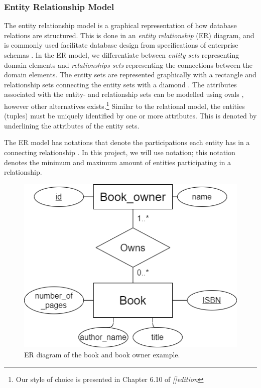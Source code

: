 \subsubsection{Entity Relationship Model}\label{sec:EntityRelationModel}
The entity relationship model is a graphical representation of how database relations are structured.
This is done in an \textit{entity relationship} (ER) diagram, and is commonly used facilitate database design from specifications of enterprise schemas \cite{DBSBook}.
In the ER model, we differentiate between \textit{entity sets} representing domain elements and \textit{relationships sets} representing the connections between the domain elements. 
The entity sets are represented graphically with a rectangle and relationship sets connecting the entity sets with a diamond \cite{DBSBook}.
The attributes associated with the entity- and relationship sets can be modelled using ovals \cite{KatjaFirstPP}, however other alternatives exists.\footnote{Our style of choice is presented in Chapter 6.10 of  \textit{[]{edition}}}
Similar to the relational model, the entities (tuples) must be uniquely identified by one or more attributes. This is denoted by underlining the attributes of the entity sets. 

The ER model has notations that denote the participations each entity has in a connecting relationship \cite{DBSBook}.
In this project, we will use  notation; this notation denotes the minimum and maximum amount of entities participating in a relationship. 

\begin{figure}[htp]
    \centering
    \includegraphics[scale=0.5]{Images/book_example_w_cardinality.png}
    \caption{ER diagram of the book and book owner example.}
    \label{fig:ER_Book_Example}
\end{figure}

